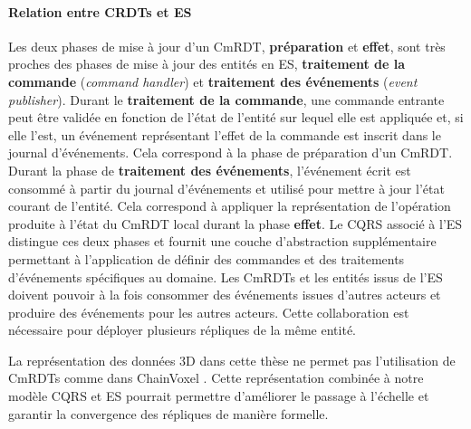 \paragraph{Relation entre \glspl{CRDT} et \acrlong{ES}}
Les deux phases de mise à jour d'un CmRDT, \textbf{préparation} et \textbf{effet}, 
sont très proches des phases de mise à jour des entités en \gls{ES}, 
\textbf{traitement de 
la commande }(\textit{command handler}) et \textbf{traitement des événements} 
(\textit{event 
publisher}). 
Durant le \textbf{traitement de la commande}, une commande entrante peut être 
validée en fonction de l'état de l'entité sur lequel elle est appliquée et, si elle l'est, 
un événement représentant l'effet de la commande est inscrit dans le journal 
d'événements. Cela correspond à la phase de préparation d'un CmRDT. 
Durant la 
phase de \textbf{traitement des événements}, l'événement écrit est consommé à 
partir du journal d'événements et utilisé pour mettre à jour l'état courant de l'entité. 
Cela correspond à appliquer la représentation de l'opération produite à l'état du 
CmRDT local durant la phase \textbf{effet}. Le \gls{CQRS} associé à l'\gls{ES} 
distingue ces deux phases et fournit une couche d'abstraction supplémentaire 
permettant à l'application de définir des 
commandes et des traitements d'événements spécifiques au domaine.
Les CmRDTs et les entités issus de l'\gls{ES} doivent pouvoir à la fois 
consommer des événements issues d'autres acteurs et produire des événements 
pour les autres acteurs. Cette collaboration est nécessaire pour déployer plusieurs 
répliques de la même entité. 

La représentation des données 3D dans cette thèse ne permet pas l'utilisation de 
CmRDTs comme dans ChainVoxel \cite{Imae2016}. Cette représentation 
combinée à notre modèle \gls{CQRS} et \gls{ES} pourrait permettre d'améliorer le 
passage à l'échelle et garantir la convergence des répliques de manière formelle.
%




